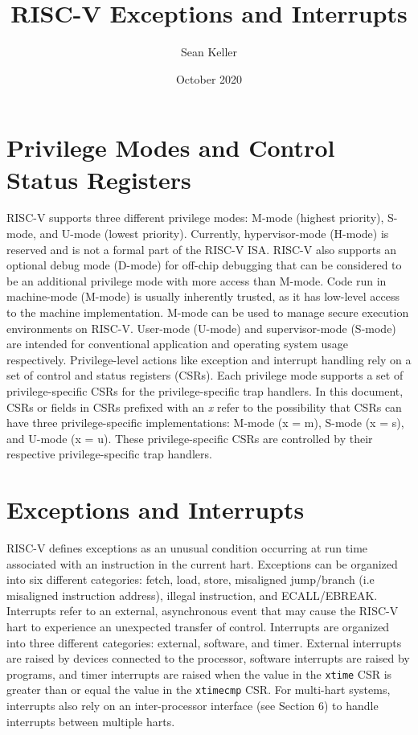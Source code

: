 \documentclass[12pt]{article}
\title{RISC-V Exceptions and Interrupts}
\author{Sean Keller}
\date{October 2020}
\begin{document}
\maketitle
\newpage

\section{Privilege Modes and Control Status Registers}
RISC-V supports three different privilege modes: M-mode (highest priority), S-mode, and U-mode (lowest priority). Currently, hypervisor-mode (H-mode) is reserved and is not a formal part of the RISC-V ISA. RISC-V also supports an optional debug mode (D-mode) for off-chip debugging that can be considered to be an additional privilege mode with more access than M-mode. Code run in machine-mode (M-mode) is usually inherently trusted, as it has low-level access to the machine implementation. M-mode can be used to manage secure execution environments on RISC-V. User-mode (U-mode) and supervisor-mode (S-mode) are intended for conventional application and operating system usage respectively. Privilege-level actions like exception and interrupt handling rely on a set of control and status registers (CSRs). Each privilege mode supports a set of privilege-specific CSRs for the privilege-specific trap handlers. In this document, CSRs or fields in CSRs prefixed with an \emph{x} refer to the possibility that CSRs can have three privilege-specific implementations: M-mode (x = m), S-mode (x = s), and U-mode (x = u). These privilege-specific CSRs are controlled by their respective privilege-specific trap handlers. 

\section{Exceptions and Interrupts}
RISC-V defines exceptions as an unusual condition occurring at run time associated with an instruction in the current hart. Exceptions can be organized into six different categories: fetch, load, store, misaligned jump/branch (i.e misaligned instruction address), illegal instruction, and ECALL/EBREAK. Interrupts refer to an external, asynchronous event that may cause the RISC-V hart to experience an unexpected transfer of control. Interrupts are organized into three different categories: external, software, and timer. External interrupts are raised by devices connected to the processor, software interrupts are raised by programs, and timer interrupts are raised when the value in the {\tt{xtime}} CSR is greater than or equal the value in the {\tt{xtimecmp}} CSR. For multi-hart systems, interrupts also rely on an inter-processor interface (see Section 6) to handle interrupts between multiple harts.
\end{document}
